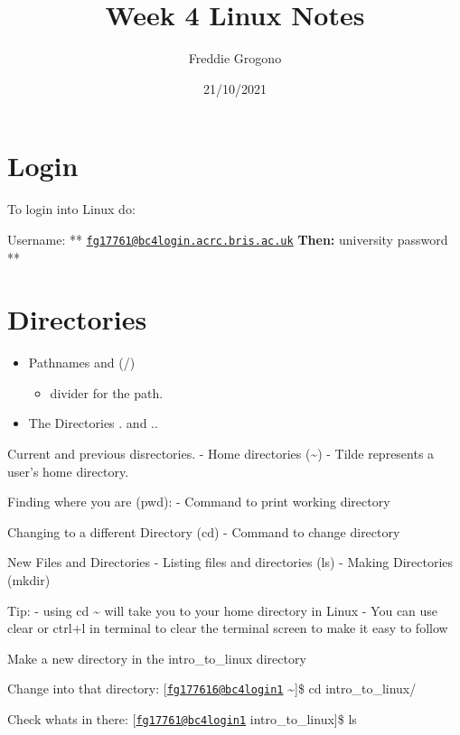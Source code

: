 \documentclass[
]{article}
\title{Week 4 Linux Notes}
\author{Freddie Grogono}
\date{21/10/2021}
\providecommand{\tightlist}{%
  \setlength{\itemsep}{0pt}\setlength{\parskip}{0pt}}
\begin{document}
\maketitle

\hypertarget{login}{%
\section{Login}\label{login}}

To login into Linux do:

Username: **
\href{mailto:fg17761@bc4login.acrc.bris.ac.uk}{\nolinkurl{fg17761@bc4login.acrc.bris.ac.uk}}
\textbf{ Then: } university password **

\hypertarget{directories}{%
\section{Directories}\label{directories}}

\begin{itemize}
\tightlist
\item
  Pathnames and (/)

  \begin{itemize}
  \tightlist
  \item
    divider for the path.
  \end{itemize}
\item
  The Directories . and ..
\end{itemize}

Current and previous disrectories. - Home directories (\textasciitilde)
- Tilde represents a user's home directory.

Finding where you are (pwd): - Command to print working directory

Changing to a different Directory (cd) - Command to change directory

New Files and Directories - Listing files and directories (ls) - Making
Directories (mkdir)

Tip: - using cd \textasciitilde{} will take you to your home directory
in Linux - You can use clear or ctrl+l in terminal to clear the terminal
screen to make it easy to follow

Make a new directory in the intro\_to\_linux directory

Change into that directory:
{[}\href{mailto:fg177616@bc4login1}{\nolinkurl{fg177616@bc4login1}}
\textasciitilde{]}\$ cd intro\_to\_linux/

Check whats in there:
{[}\href{mailto:fg17761@bc4login1}{\nolinkurl{fg17761@bc4login1}}
intro\_to\_linux{]}\$ ls
\end{document}
